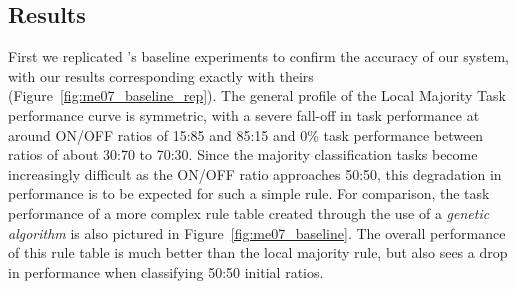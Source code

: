 \documentclass[a4paper,11pt]{report}
\begin{document}
\subsection*{Results}
First we replicated \citeauthor{me07}'s baseline experiments to confirm the accuracy of our system, with our results corresponding exactly with theirs (Figure~\ref{fig:me07_baseline_rep}). The general profile of the Local Majority Task performance curve is symmetric, with a severe fall-off in task performance at around ON/OFF ratios of 15:85 and 85:15 and 0\% task performance between ratios of about 30:70 to 70:30. Since the majority classification tasks become increasingly difficult as the ON/OFF ratio approaches 50:50, this degradation in performance is to be expected for such a simple rule. For comparison, the task performance of a more complex rule table created through the use of a \textit{genetic algorithm} is also pictured in Figure~\ref{fig:me07_baseline}. The overall performance of this rule table is much better than the local majority rule, but also sees a drop in performance when classifying 50:50 initial ratios.
\end{document}
